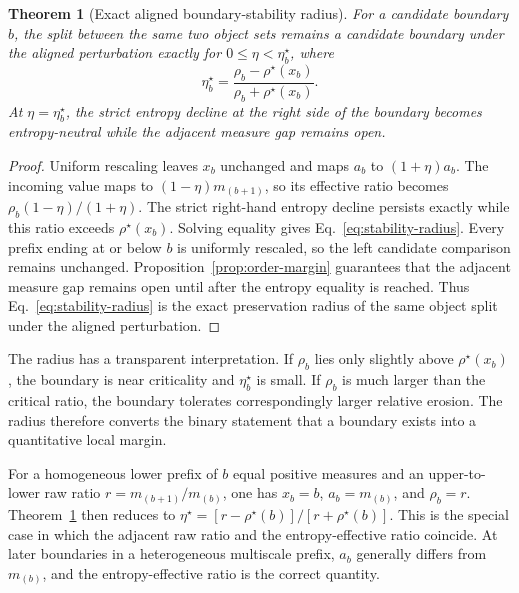 \documentclass[aip,cha,reprint,superscriptaddress,floatfix]{revtex4-2}
\newtheorem{theorem}{Theorem}
\theoremstyle{definition}
\theoremstyle{remark}
\newcommand{\rhostar}{\rho^{\star}}
\begin{document}
\begin{theorem}[Exact aligned boundary-stability radius]
\label{thm:stability}
For a candidate boundary \(b\), the split between the same two object sets remains a candidate boundary under the aligned perturbation exactly for \(0\le\eta<\eta_b^\star\), where
\begin{equation}
\eta_b^\star
=
\frac{\rho_b-\rhostar(x_b)}{\rho_b+\rhostar(x_b)}.
\label{eq:stability-radius}
\end{equation}
At \(\eta=\eta_b^\star\), the strict entropy decline at the right side of the boundary becomes entropy-neutral while the adjacent measure gap remains open.
\end{theorem}

\begin{proof}
Uniform rescaling leaves \(x_b\) unchanged and maps \(a_b\) to \((1+\eta)a_b\). The incoming value maps to \((1-\eta)m_{(b+1)}\), so its effective ratio becomes \(\rho_b(1-\eta)/(1+\eta)\). The strict right-hand entropy decline persists exactly while this ratio exceeds \(\rhostar(x_b)\). Solving equality gives Eq.~\eqref{eq:stability-radius}. Every prefix ending at or below \(b\) is uniformly rescaled, so the left candidate comparison remains unchanged. Proposition~\ref{prop:order-margin} guarantees that the adjacent measure gap remains open until after the entropy equality is reached. Thus Eq.~\eqref{eq:stability-radius} is the exact preservation radius of the same object split under the aligned perturbation.
\end{proof}

The radius has a transparent interpretation. If \(\rho_b\) lies only slightly above \(\rhostar(x_b)\), the boundary is near criticality and \(\eta_b^\star\) is small. If \(\rho_b\) is much larger than the critical ratio, the boundary tolerates correspondingly larger relative erosion. The radius therefore converts the binary statement that a boundary exists into a quantitative local margin.

For a homogeneous lower prefix of \(b\) equal positive measures and an upper-to-lower raw ratio \(r=m_{(b+1)}/m_{(b)}\), one has \(x_b=b\), \(a_b=m_{(b)}\), and \(\rho_b=r\). Theorem~\ref{thm:stability} then reduces to \(\eta^\star=[r-\rhostar(b)]/[r+\rhostar(b)]\). This is the special case in which the adjacent raw ratio and the entropy-effective ratio coincide. At later boundaries in a heterogeneous multiscale prefix, \(a_b\) generally differs from \(m_{(b)}\), and the entropy-effective ratio is the correct quantity.
\end{document}
